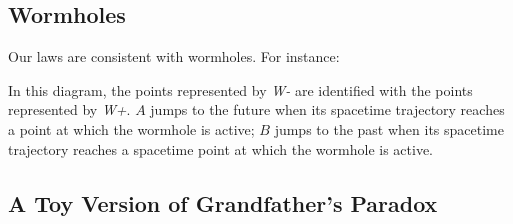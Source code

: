 \documentclass[12pt]{extarticle}
\begin{document}
\subsection{Wormholes}
Our laws are consistent with wormholes. For instance:

\begin{figure}[ht]
\begin{center}
\end{center}
\label{f-wormhole}
\end{figure}

In this diagram, the points represented by \emph{W-} are identified with the points represented by \emph{W+}. $A$ jumps to the future when its spacetime trajectory reaches a point at which the wormhole is active; $B$ jumps to the past when its spacetime trajectory reaches a spacetime point at which the wormhole is active.


\subsection{A Toy Version of Grandfather's Paradox}
\end{document}
